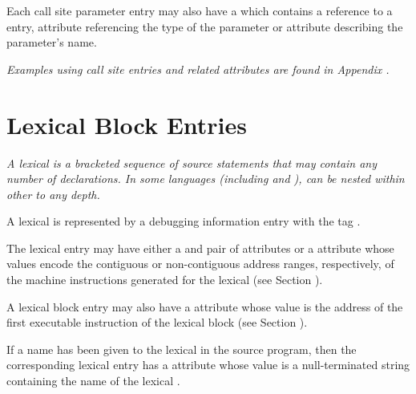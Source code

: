 Each call site parameter entry may also have a
\DWATcallparameterDEFN{}
which contains a reference to a \DWTAGformalparameter{} entry,
\DWATtype{} attribute referencing the type of the parameter or
\DWATname{} attribute describing the parameter's name.

\textit{Examples using call site entries and related attributes are
found in Appendix .}

\section{Lexical Block Entries}
\label{chap:lexicalblockentries}

\textit{A
lexical 
is
a bracketed sequence of source statements
that may contain any number of declarations. In some languages
(including  and ),
 can be nested within other
 to any depth.}

A lexical  is represented by a debugging information
entry with the
tag \DWTAGlexicalblockTARG.

The lexical 
entry may have
either a \DWATlowpc{} and
\DWAThighpc{} pair of
attributes
or
a
\DWATranges{} attribute
whose values encode the contiguous or non-contiguous address
ranges, respectively, of the machine instructions generated
for the lexical 
(see Section ).

A\hypertarget{chap:DWATentrypcoflexicalblock}{}
lexical block entry may also have a
\DWATentrypc{} attribute
whose value is the address of the first executable instruction
of the lexical block (see
Section ).

If a name has been given to the lexical 
in the source program, then the corresponding
lexical  entry has a
\DWATname{} attribute whose
value is a null-terminated string
containing the name of the lexical .

